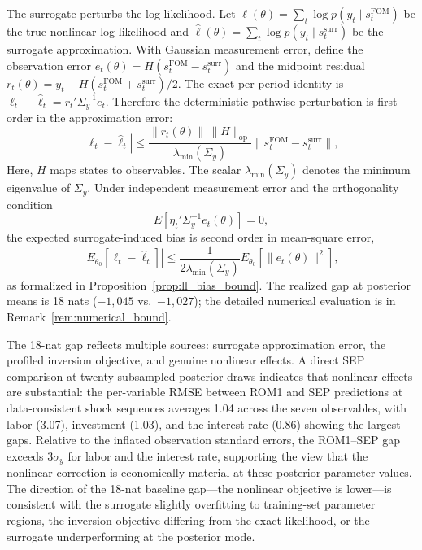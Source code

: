 \documentclass[12pt]{article}
\theoremstyle{plain}
\theoremstyle{definition}
\theoremstyle{remark}
\newcommand{\Sigmay}{\Sigma_y}
\begin{document}
The surrogate perturbs the log-likelihood. Let $\ell(\theta) = \sum_t \log p(y_t \mid s_t^{\text{FOM}})$ be the true nonlinear log-likelihood and $\hat{\ell}(\theta) = \sum_t \log p(y_t \mid s_t^{\text{surr}})$ be the surrogate approximation. With Gaussian measurement error, define the observation error $e_t(\theta) = H(s_t^{\text{FOM}} - s_t^{\text{surr}})$ and the midpoint residual $r_t(\theta) = y_t - H(s_t^{\text{FOM}} + s_t^{\text{surr}})/2$. The exact per-period identity is $\ell_t-\hat\ell_t = r_t'\Sigmay^{-1}e_t$. Therefore the deterministic pathwise perturbation is first order in the approximation error:
\begin{equation}
|\ell_t - \hat{\ell}_t|
\leq
\frac{\|r_t(\theta)\|\,\|H\|_{\mathrm{op}}}{\lambda_{\min}(\Sigmay)}
\|s_t^{\text{FOM}} - s_t^{\text{surr}}\|,
\label{eq:ll_bias_bound}
\end{equation}
Here, $H$ maps states to observables. The scalar $\lambda_{\min}(\Sigmay)$ denotes the minimum eigenvalue of $\Sigmay$. Under independent measurement error and the orthogonality condition
\[
E\left[\eta_t'\Sigmay^{-1}e_t(\theta)\right]=0,
\]
the expected surrogate-induced bias is second order in mean-square error,
\[
\left|E_{\theta_0}\left[\ell_t-\hat\ell_t\right]\right|
\leq
\frac{1}{2\lambda_{\min}(\Sigmay)}
E_{\theta_0}\left[\|e_t(\theta)\|^2\right],
\]
as formalized in Proposition~\ref{prop:ll_bias_bound}. The realized gap at posterior means is 18 nats ($-1{,}045$ vs.\ $-1{,}027$); the detailed numerical evaluation is in Remark~\ref{rem:numerical_bound}.

The 18-nat gap reflects multiple sources: surrogate approximation error, the profiled inversion objective, and genuine nonlinear effects. A direct SEP comparison at twenty subsampled posterior draws indicates that nonlinear effects are substantial: the per-variable RMSE between ROM1 and SEP predictions at data-consistent shock sequences averages 1.04 across the seven observables, with labor (3.07), investment (1.03), and the interest rate (0.86) showing the largest gaps. Relative to the inflated observation standard errors, the ROM1--SEP gap exceeds $3\sigma_y$ for labor and the interest rate, supporting the view that the nonlinear correction is economically material at these posterior parameter values. The direction of the 18-nat baseline gap---the nonlinear objective is lower---is consistent with the surrogate slightly overfitting to training-set parameter regions, the inversion objective differing from the exact likelihood, or the surrogate underperforming at the posterior mode.
\end{document}
